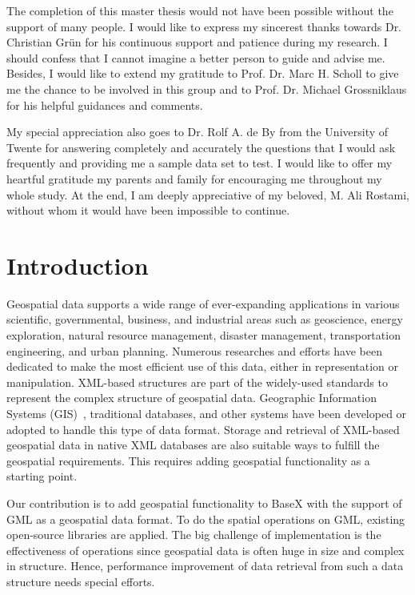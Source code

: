 \documentclass[a4paper,12pt]{article}
\begin{document}
The completion of this master thesis would not have been possible 
without the support of many people. 
I would like to express my sincerest thanks towards 
Dr. Christian Gr{\"u}n for his continuous support and patience during my research.
I should confess that I cannot imagine a better person to guide and advise me. Besides, I would like to extend my gratitude to Prof. Dr. Marc H. Scholl to give me the chance to be involved in this group and to Prof. Dr. Michael Grossniklaus for his helpful guidances and comments.

My special appreciation also goes to Dr. Rolf A. de By from the University of Twente for
answering completely and accurately the questions that I would ask
frequently and providing me a sample data set to test. I would like to offer my heartful gratitude my parents and family for encouraging me 
throughout my whole study. At the end, I am deeply appreciative of my beloved, M. Ali Rostami, without whom it would have been impossible to continue.


\newpage
\tableofcontents

\thispagestyle{empty}
\newpage
\section{Introduction}
\setcounter{page}{1}
Geospatial data supports a wide range of ever-expanding applications in various scientific, governmental, business, and industrial areas such as geoscience, energy exploration, natural resource management, disaster management, transportation engineering, and urban planning. 
Numerous researches and efforts have been dedicated to make the most efficient use of this data, either in representation or manipulation. 
XML-based structures are part of the widely-used standards to represent the complex structure of geospatial data. 
Geographic Information Systems (GIS)~\cite{gis-intro}, traditional databases, and other systems have been developed or adopted to handle this type of data format. 
Storage and retrieval of XML-based geospatial data in native XML databases are also suitable ways to fulfill the geospatial requirements. This requires adding geospatial functionality as a starting point.

Our contribution is to add geospatial functionality to BaseX with the support of GML as a geospatial data format. 
To do the spatial operations on GML, existing open-source libraries are applied.
The big challenge of implementation is the effectiveness of operations
since geospatial data is often huge in size and complex in structure.
Hence, performance improvement of data retrieval from such a data structure 
needs special efforts. 
\end{document}
